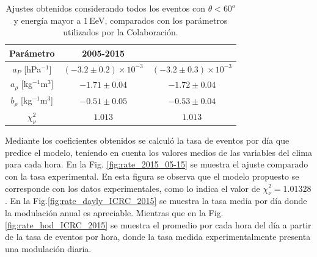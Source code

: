         \begin{table}[H]
            \centering
            \begin{tabular}{c|c|c}
            {Parámetro}                 & {2005-2015}                   & \cite{aab2017impact}              \\ \hline
            $a_P$ [hPa$^{-1}$]          & $(-3.2 \pm 0.2)\times 10^{-3}$& $(-3.2 \pm 0.3)\times 10^{-3}$    \\ \hline
            $a_\rho$ [kg$^{-1}$m$^3$]   & $-1.71 \pm 0.04 $             & $-1.72 \pm 0.04$                  \\ \hline
            $b_\rho$ [kg$^{-1}$m$^3$]   & $-0.51 \pm 0.05$              & $-0.53 \pm 0.04$                  \\ \hline
            $\chi^2_\nu$                & $1.013$                       & $1.013$                           \\ \hline
            \end{tabular} 
            \caption{Ajustes obtenidos considerando todos los eventos con $\theta<60^o$ y energía mayor a $1\,$EeV, comparados con los parámetros utilizados por la Colaboración.} \label{tabla:parametros_ICRC_2015}
        \end{table}

        Mediante los coeficientes obtenidos se calculó la tasa de eventos por día que predice el modelo, teniendo en cuenta los valores medios de las variables del clima para cada hora. En la Fig. \ref{fig:rate_2015_05-15} se muestra el ajuste comparado con la tasa experimental. En esta figura se observa que el modelo propuesto se corresponde con los datos experimentales, como lo indica el valor de $\chi^2_\nu=1.01328$. En la Fig.\ref{fig:rate_dayly_ICRC_2015} se muestra la tasa media por día donde la modulación anual es apreciable. Mientras que en la Fig.\ref{fig:rate_hod_ICRC_2015} se muestra el promedio por cada hora del día a partir de la tasa de eventos por hora, donde la tasa medida experimentalmente presenta una modulación diaria. 
        

